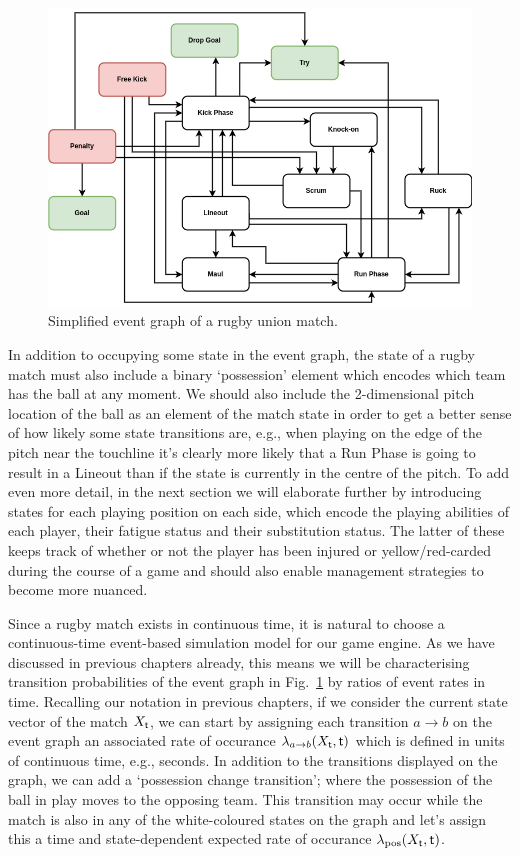 \begin{figure}[h]
\includegraphics[width=14cm]{images/trywizard-event-graph.drawio.png}
\caption{Simplified event graph of a rugby union match.}
\label{fig:event-graph}
\end{figure}

In addition to occupying some state in the event graph, the state of a rugby match must also include a binary `possession' element which encodes which team has the ball at any moment. We should also include the 2-dimensional pitch location of the ball as an element of the match state in order to get a better sense of how likely some state transitions are, e.g., when playing on the edge of the pitch near the touchline it's clearly more likely that a {\sf Run Phase} is going to result in a {\sf Lineout} than if the state is currently in the centre of the pitch. To add even more detail, in the next section we will elaborate further by introducing states for each playing position on each side, which encode the playing abilities of each player, their fatigue status and their substitution status. The latter of these keeps track of whether or not the player has been injured or yellow/red-carded during the course of a game and should also enable management strategies to become more nuanced.

Since a rugby match exists in continuous time, it is natural to choose a continuous-time event-based simulation model for our game engine. As we have discussed in previous chapters already, this means we will be characterising transition probabilities of the event graph in Fig.~\ref{fig:event-graph} by ratios of event rates in time. Recalling our notation in previous chapters, if we consider the current state vector of the match $X_{\sf t}$, we can start by assigning each transition $a\rightarrow b$ on the event graph an associated rate of occurance $\lambda_{a\rightarrow b} (X_{\sf t}, {\sf t})$ which is defined in units of continuous time, e.g., seconds. In addition to the transitions displayed on the graph, we can add a `possession change transition'; where the possession of the ball in play moves to the opposing team. This transition may occur while the match is also in any of the white-coloured states on the graph and let's assign this a time and state-dependent expected rate of occurance $\lambda_{\rm pos}(X_{\sf t}, {\sf t})$.

